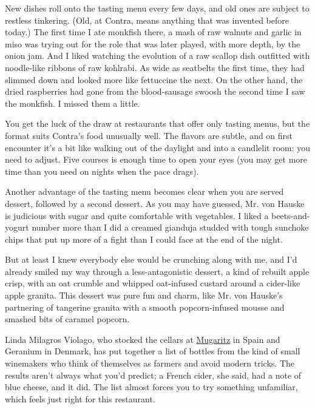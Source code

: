 New dishes roll onto the tasting menu every few days, and old ones are
subject to restless tinkering. (Old, at Contra, means anything that was
invented before today.) The first time I ate monkfish there, a mash of
raw walnuts and garlic in miso was trying out for the role that was
later played, with more depth, by the onion jam. And I liked watching
the evolution of a raw scallop dish outfitted with noodle-like ribbons
of raw kohlrabi. As wide as seatbelts the first time, they had slimmed
down and looked more like fettuccine the next. On the other hand, the
dried raspberries had gone from the blood-sausage swoosh the second time
I saw the monkfish. I missed them a little.

You get the luck of the draw at restaurants that offer only tasting
menus, but the format suits Contra's food unusually well. The flavors
are subtle, and on first encounter it's a bit like walking out of the
daylight and into a candlelit room: you need to adjust. Five courses is
enough time to open your eyes (you may get more time than you need on
nights when the pace drags).

Another advantage of the tasting menu becomes clear when you are served
dessert, followed by a second dessert. As you may have guessed, Mr. von
Hauske is judicious with sugar and quite comfortable with vegetables. I
liked a beets-and-yogurt number more than I did a creamed gianduja
studded with tough sunchoke chips that put up more of a fight than I
could face at the end of the night.

But at least I knew everybody else would be crunching along with me, and
I'd already smiled my way through a less-antagonistic dessert, a kind of
rebuilt apple crisp, with an oat crumble and whipped oat-infused custard
around a cider-like apple granita. This dessert was pure fun and charm,
like Mr. von Hauske's partnering of tangerine granita with a smooth
popcorn-infused mousse and smashed bits of caramel popcorn.

Linda Milagros Violago, who stocked the cellars at
\href{http://www.nytimes3xbfgragh.onion/2012/05/16/dining/for-them-a-great-meal-tops-good-intentions.html?action=click\&module=Search\&region=searchResults\%230\&version=\&url=http\%3A\%2F\%2Fquery.nytimes3xbfgragh.onion\%2Fsearch\%2Fsitesearch\%2F\%3Faction\%3Dclick\%26contentCollection\%3DDining\%2520\%2526\%2520Wine\%26region\%3DTopBar\%26module\%3DSearchSubmit\%26pgtype\%3Darticle\%23\%2FMugaritz}{Mugaritz}
in Spain and Geranium in Denmark, has put together a list of bottles
from the kind of small winemakers who think of themselves as farmers and
avoid modern tricks. The results aren't always what you'd predict; a
French cider, she said, had a note of blue cheese, and it did. The list
almost forces you to try something unfamiliar, which feels just right
for this restaurant.

